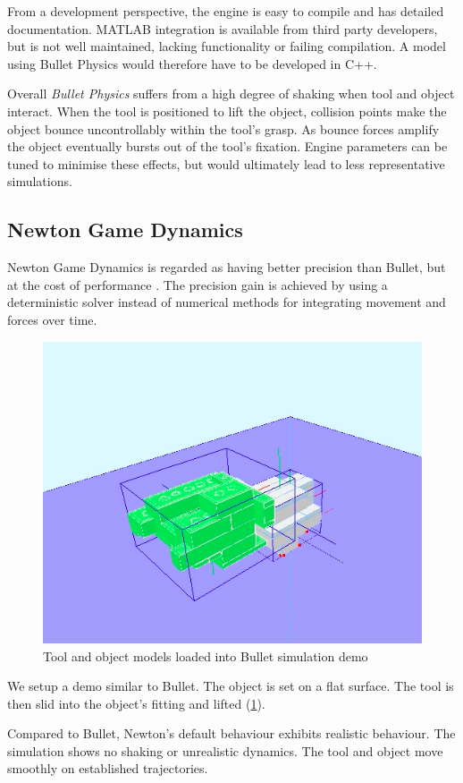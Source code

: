 \documentclass[11]{article}
\begin{document}
From a development perspective, the engine is easy to compile and has detailed documentation.
MATLAB integration is available from third party developers, but is not well maintained, lacking functionality or failing compilation.
A model using Bullet Physics would therefore have to be developed in C++. 

Overall \emph{Bullet Physics} suffers from a high degree of shaking when tool and object interact. 
When the tool is positioned to lift the object, collision points make the object bounce uncontrollably within the tool's grasp. 
As bounce forces amplify the object eventually bursts out of the tool's fixation.  
Engine parameters can be tuned to minimise these effects, but would ultimately lead to less representative simulations. 

\subsection{Newton Game Dynamics}
Newton Game Dynamics is regarded as having better precision than Bullet, but at the cost of performance \cite{hummel2012}. 
The precision gain is achieved by using a deterministic solver instead of numerical methods for integrating movement and forces over time. 

\begin{figure}[h]
  \centering
  \includegraphics[width=.5\textwidth]{figures/newton_demo.png}
  \caption{Tool and object models loaded into Bullet simulation demo}
  \label{fig:newton_demo}
\end{figure}      

We setup a demo similar to Bullet.
The object is set on a flat surface. 
The tool is then slid into the object's fitting and lifted (\ref{fig:newton_demo}). 

Compared to Bullet, Newton's default behaviour exhibits realistic behaviour. 
The simulation shows no shaking or unrealistic dynamics.
The tool and object move smoothly on established trajectories. 
\end{document}
